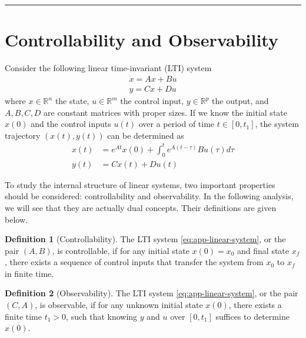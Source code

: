 \documentclass[
]{book}
\theoremstyle{definition}
\newtheorem{definition}{Definition}[chapter]
\theoremstyle{definition}
\theoremstyle{definition}
\theoremstyle{definition}
\theoremstyle{remark}
\begin{document}
\begin{center}\rule{0.5\linewidth}{0.5pt}\end{center}

\section{Controllability and Observability}\label{app-lti-controllable-observable}

Consider the following linear time-invariant (LTI) system
\begin{equation}
    \label{eq:app-linear-system}
   \begin{split}
      \dot{x} = A x + B u \\ 
      y = C x + D u
   \end{split}
\end{equation}
where \(x \in \mathbb{R}^n\) the state, \(u \in \mathbb{R}^m\) the control input, \(y \in \mathbb{R}^p\) the output, and \(A,B,C,D\) are constant matrices with proper sizes. If we know the initial state \(x(0)\) and the control inputs \(u(t)\) over a period of time \(t \in [0, t_1]\), the system trajectory \((x(t), y(t))\) can be determined as
\begin{equation}
    \label{eq:app-lti-xy}
   \begin{split}
      x(t) & = e^{At} x(0) + \int_{0}^{t} e^{A(t-\tau)} B u(\tau) d\tau \\ 
      y(t) & = C x(t) + D u(t)
   \end{split}
\end{equation}

To study the internal structure of linear systems, two important properties should be considered: controllability and observability. In the following analysis, we will see that they are actually dual concepts. Their definitions \citep{chen1984book-linear} are given below.

\begin{definition}[Controllability]
\protect\hypertarget{def:lticontrollable}{}\label{def:lticontrollable}The LTI system \eqref{eq:app-linear-system}, or the pair \((A, B)\), is controllable, if for any initial state \(x(0) = x_0\) and final state \(x_f\), there exists a sequence of control inputs that transfer the system from \(x_0\) to \(x_f\) in finite time.
\end{definition}

\begin{definition}[Observability]
\protect\hypertarget{def:ltiobservable}{}\label{def:ltiobservable}The LTI system \eqref{eq:app-linear-system}, or the pair \((C, A)\), is observable, if for any unknown initial state \(x(0)\), there exists a finite time \(t_1 > 0\), such that knowing \(y\) and \(u\) over \([0, t_1]\) suffices to determine \(x(0)\).
\end{definition}
\end{document}
